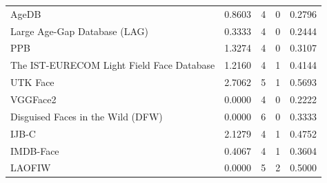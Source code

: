 \documentclass[journal]{IEEEtran}
\begin{document}
\begin{table}[!t]
\begin{tabular}{|p{}|C{0.11\textwidth}|C{0.11\textwidth}|C{0.11\textwidth}|C{0.11\textwidth}|}
AgeDB \cite{moschoglou2017agedb}                                                        & 0.8603                           & 4                               & 0                                  & 0.2796                    \\
Large Age-Gap Database (LAG) \cite{bianco2017large}                                     & 0.3333                           & 4                               & 0                                  & 0.2444                    \\
PPB \cite{buolamwini2018gender}                                                         & 1.3274                           & 4                               & 0                                  & 0.3107                    \\
The IST-EURECOM Light Field Face Database \cite{sepas2017eurecom}                       & 1.2160                           & 4                               & 1                                  & 0.4144                    \\
UTK Face \cite{zhang2017age}                                                            & 2.7062                           & 5                               & 1                                  & 0.5693                    \\
VGGFace2 \cite{cao2018vggface2}                                                         & 0.0000                           & 4                               & 0                                  & 0.2222                    \\
Disguised Faces in the Wild (DFW) \cite{kushwaha2018disguised}                          & 0.0000                           & 6                               & 0                                  & 0.3333                    \\
IJB-C \cite{maze2018iarpa}                                                              & 2.1279                           & 4                               & 1                                  & 0.4752                    \\
IMDB-Face \cite{wang2018devil}                                                          & 0.4067                           & 4                               & 1                                  & 0.3604                    \\
LAOFIW \cite{alvi2018turning}                                                           & 0.0000                           & 5                               & 2                                  & 0.5000                    \\

\end{tabular}
\end{table}
\end{document}
